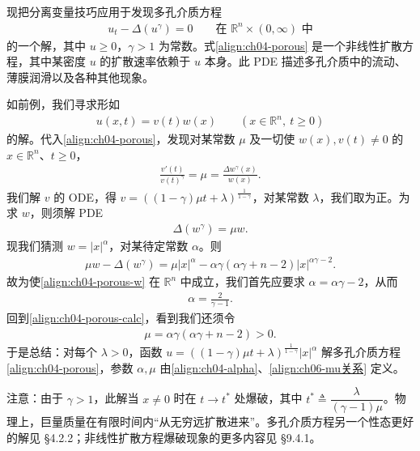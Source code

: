 \documentclass[../../main.tex]{subfiles}
\begin{document}
\begin{example}\label{example:ch04-porous}
现把分离变量技巧应用于发现多孔介质方程
\begin{align}\label{align:ch04-porous}
u_t-\Delta(u^\gamma)=0 \qquad\text{在 }\mathbb{R}^n\times(0,\infty)\text{ 中}
\end{align}
的一个解，其中 $u\geqslant 0$，$\gamma>1$ 为常数。式\eqref{align:ch04-porous} 是一个非线性扩散方程，其中某密度 $u$ 的扩散速率依赖于 $u$ 本身。此 PDE 描述多孔介质中的流动、薄膜润滑以及各种其他现象。

如前例，我们寻求形如
\begin{align}\label{align:ch04-porous-product}
u(x,t)=v(t)w(x) \qquad(x\in\mathbb{R}^n,\ t\geqslant 0)
\end{align}
的解。代入\eqref{align:ch04-porous}，发现对某常数 $\mu$ 及一切使 $w(x),v(t)\neq 0$ 的 $x\in\mathbb{R}^n$、$t\geqslant 0$，
\begin{align}\label{align:ch04-porous-ratio}
\frac{v'(t)}{v(t)^\gamma}=\mu=\frac{\Delta w^\gamma(x)}{w(x)}.
\end{align}
我们解 $v$ 的 ODE，得 $v=((1-\gamma)\mu t+\lambda)^{\frac{1}{1-\gamma}}$，对某常数 $\lambda$，我们取为正。为求 $w$，则须解 PDE
\begin{align}\label{align:ch04-porous-w}
\Delta(w^\gamma)=\mu w.
\end{align}
现我们猜测 $w=|x|^\alpha$，对某待定常数 $\alpha$。则
\begin{align}\label{align:ch04-porous-calc}
\mu w-\Delta(w^\gamma)=\mu|x|^\alpha-\alpha\gamma(\alpha\gamma+n-2)|x|^{\alpha\gamma-2}.
\end{align}
故为使\eqref{align:ch04-porous-w} 在 $\mathbb{R}^n$ 中成立，我们首先应要求 $\alpha=\alpha\gamma-2$，从而
\begin{align}\label{align:ch04-alpha}
\alpha=\frac{2}{\gamma-1}.
\end{align}
回到\eqref{align:ch04-porous-calc}，看到我们还须令
\begin{align}\label{align:ch06-mu关系}
\mu=\alpha\gamma(\alpha\gamma+n-2)>0.
\end{align}
于是总结：对每个 $\lambda>0$，函数 $u=((1-\gamma)\mu t+\lambda)^{\frac{1}{1-\gamma}}|x|^\alpha$ 解多孔介质方程\eqref{align:ch04-porous}，参数 $\alpha,\mu$ 由\eqref{align:ch04-alpha}、\eqref{align:ch06-mu关系} 定义。
\end{example}

\begin{remark}\label{remark:ch04-porous-blowup}
注意：由于 $\gamma>1$，此解当 $x\neq 0$ 时在 $t\to t^*$ 处爆破，其中 $t^*\triangleq\dfrac{\lambda}{(\gamma-1)\mu}$。物理上，巨量质量在有限时间内``从无穷远扩散进来''。多孔介质方程另一个性态更好的解见 \S4.2.2；非线性扩散方程爆破现象的更多内容见 \S9.4.1。
\end{remark}
\end{document}
